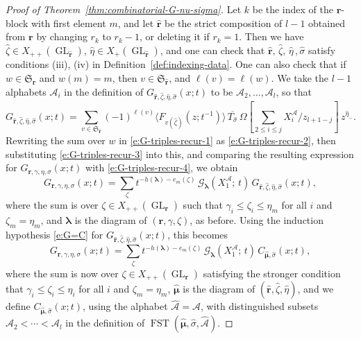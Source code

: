 \documentclass[12pt]{amsart}
\theoremstyle{definition}
\theoremstyle{remark}
\newcommand{\rr}{{\mathbf r}}
\newcommand{\lambold}{{\boldsymbol \lambda }}
\newcommand{\mubold}{{\boldsymbol \mu}}
\newcommand{\Sfrak}{{\mathfrak S}}
\newcommand{\Acal}{{\mathcal A}}
\newcommand{\Gcal}{{\mathcal G}}
\newcommand{\sigmahat}{\widehat{\sigma }}
\newcommand{\rrhat}{\widehat{\rr }}
\newcommand{\etahat}{\widehat{\eta }}
\newcommand{\zetahat}{\widehat{\zeta }}
\newcommand{\muboldhat}{\widehat{\mubold }}
\newcommand{\Acalhat}{\widehat{\Acal  }}
\DeclareMathOperator{\GL}{GL}
\DeclareMathOperator{\FSST}{FST}
\begin{document}
\begin{proof}[Proof of Theorem~\ref{thm:combinatorial-G-nu-sigma}]
Let $k$ be the index of the $\rr $-block with first element $m$, and
let $\rrhat $ be the strict composition of $l-1$ obtained from $\rr $
by changing $r_{k}$ to $r_{k}-1$, or deleting it if $r_{k}=1$.  Then
we have $\zetahat \in X_{++}(\GL _{\rrhat })$, $\etahat \in X_{+}(\GL
_{\rrhat })$, and one can check that $\rrhat ,\, \zetahat ,\, \etahat
\, ,\sigmahat $ satisfy conditions (iii), (iv) in
Definition~\ref{def:indexing-data}.  One can also check that if $w\in
\Sfrak _{\rr }$ and $w(m) = m$, then $v\in \Sfrak _{\rrhat }$, and
$\ell (v) = \ell (w)$.  We take the $l-1$ alphabets $\Acal_{i}$ in the
definition of $G_{\rrhat ,\zetahat ,\etahat ,\sigmahat }(x;t)$ to be
$\Acal_{2},\ldots,\Acal_{l}$, so that
\begin{equation}\label{e:G-triples-recur-4}
G_{\rrhat ,\zetahat ,\etahat ,\sigmahat }(x;t) = \sum _{v\in \Sfrak
_{\rrhat }} (-1)^{\ell (v)} \langle F_{v(\zetahat )}(z; t^{-1})
\rangle \,\overline{T_{\sigmahat }}\, \Omega [\sum _{2\leq i\leq j}
X^\Acal_{i} /z_{l+1-j}] \, z^{\etahat _{-}}.
\end{equation}
Rewriting the sum over $w$ in \eqref{e:G-triples-recur-1} as
\eqref{e:G-triples-recur-2}, then substituting
\eqref{e:G-triples-recur-3} into this, and comparing the resulting
expression for $G_{\rr ,\gamma ,\eta ,\sigma }(x;t)$ with
\eqref{e:G-triples-recur-4}, we obtain
\begin{equation}\label{e:G-triples-recur-5}
G_{\rr ,\gamma ,\eta ,\sigma }(x;t) = \sum _{\zeta } t^{-h(\lambold )
- e_{m}(\zeta )}\, \Gcal _{\lambold }(X^\Acal_{1};\, t) \, G_{\rrhat
,\zetahat ,\etahat ,\sigmahat }(x;t),
\end{equation}
where the sum is over $\zeta \in
X_{++}(\GL _{\rr })$ such that $\gamma _{i}\leq \zeta _{i}\leq \eta
_{m}$ for all $i$ and $\zeta _{m} = \eta _{m}$, and $\lambold $ is the
diagram of $(\rr ,\gamma ,\zeta )$, as before.  Using the induction
hypothesis \eqref{e:G=C} for $G_{\rrhat ,\zetahat ,\etahat ,\sigmahat
}(x;t)$,
this becomes
\begin{equation}\label{e:G-triples-recur-6}
G_{\rr ,\gamma ,\eta ,\sigma }(x;t) = \sum _{\zeta } t^{-h(\lambold )
- e_{m}(\zeta )}\, \Gcal _{\lambold }(X^\Acal_{1};\, t) \, C_{\muboldhat
,\sigmahat }(x;t),
\end{equation}
where the sum is now over $\zeta \in X_{++}(\GL _{\rr })$ satisfying
the stronger condition that $\gamma _{i}\leq \zeta _{i}\leq \eta _{i}$
for all $i$ and $\zeta _{m} = \eta _{m}$, $\muboldhat $ is the diagram
of $(\rrhat ,\zetahat ,\etahat )$, and we define $C_{\muboldhat
,\sigmahat }(x;t)$, using the alphabet $\Acalhat =\Acal $, with
distinguished subsets $\Acal _{2}<\cdots <\Acal _{l}$ in the
definition of $\FSST (\muboldhat ,\sigmahat ,\Acalhat )$.


\end{proof}
\end{document}
